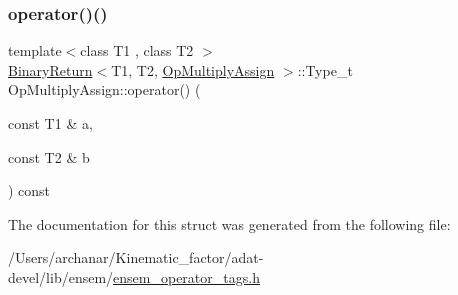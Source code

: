 \subsubsection{\texorpdfstring{operator()()}{operator()()}\hspace{0.1cm}{\footnotesize\ttfamily [3/3]}}
{\footnotesize\ttfamily template$<$class T1 , class T2 $>$ \\
\mbox{\hyperlink{structBinaryReturn}{Binary\+Return}}$<$T1, T2, \mbox{\hyperlink{structOpMultiplyAssign}{Op\+Multiply\+Assign}} $>$\+::Type\+\_\+t Op\+Multiply\+Assign\+::operator() (\begin{DoxyParamCaption}\item[{const T1 \&}]{a,  }\item[{const T2 \&}]{b }\end{DoxyParamCaption}) const\hspace{0.3cm}{\ttfamily [inline]}}



The documentation for this struct was generated from the following file\+:\begin{DoxyCompactItemize}
\item 
/\+Users/archanar/\+Kinematic\+\_\+factor/adat-\/devel/lib/ensem/\mbox{\hyperlink{adat-devel_2lib_2ensem_2ensem__operator__tags_8h}{ensem\+\_\+operator\+\_\+tags.\+h}}\end{DoxyCompactItemize}
